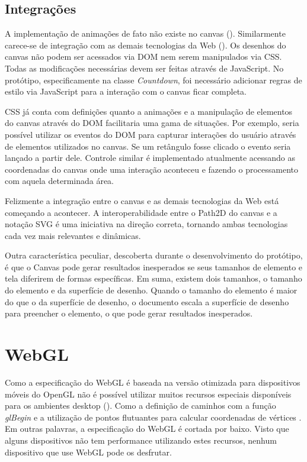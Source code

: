 \subsection{Integrações}

A implementação de animações de fato não existe no canvas
(). Similarmente carece-se de integração
com as demais tecnologias da Web ().
Os desenhos do canvas não podem ser acessados via DOM nem serem
manipulados via CSS. Todas as modificações necessárias devem ser
feitas através de JavaScript. No protótipo, especificamente na classe
\textit{Countdown}, foi necessário adicionar regras de estilo via
JavaScript para a interação com o canvas ficar completa.

CSS já conta com definições quanto a animações e a manipulação de
elementos do canvas através do DOM facilitaria uma gama de situações.
Por exemplo, seria possível utilizar os eventos do DOM para capturar
interações do usuário através de elementos utilizados no canvas.
Se um retângulo fosse clicado o evento seria lançado a partir dele.
Controle similar é implementado atualmente acessando as coordenadas
do canvas onde uma interação aconteceu e fazendo o processamento com
aquela determinada área.

Felizmente a integração entre o canvas e as demais tecnologias da
Web está começando a acontecer. A interoperabilidade entre o Path2D
do canvas e a notação SVG é uma iniciativa na direção correta,
tornando ambas tecnologias cada vez mais relevantes e dinâmicas.

Outra característica peculiar, descoberta durante o desenvolvimento
do protótipo, é que o Canvas pode gerar resultados inesperados se
seus tamanhos de elemento e tela diferirem de formas específicas. Em
suma, existem dois tamanhos, o tamanho do elemento e da superfície de
desenho. Quando o tamanho do elemento é maior do que o da superfície
de desenho, o documento escala a superfície de desenho para preencher o
elemento, o que pode gerar resultados inesperados.

\section{WebGL}

Como a especificação do WebGL é baseada na versão otimizada
para dispositivos móveis do OpenGL não é possível utilizar
muitos recursos especiais disponíveis para os ambientes desktop
(). Como a definição de caminhos
com a função \textit{glBegin} e a utilização de pontos flutuantes
para calcular coordenadas de vértices \autocite{esVsGl}. Em outras
palavras, a especificação do WebGL é cortada por baixo. Visto que
alguns dispositivos não tem performance utilizando estes recursos,
nenhum dispositivo que use WebGL pode os desfrutar.

